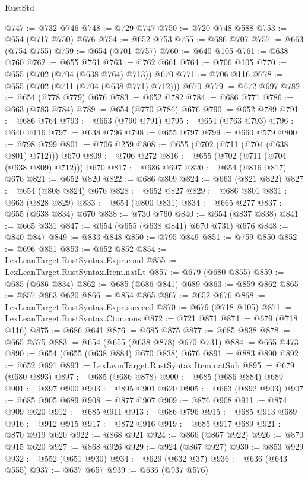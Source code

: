 \begin{lexlean}{RustStd}
\begin{coremodule}
@747 := @732 @746
@748 := @729 @747
@750 := @720 @748 @588
@753 := @654 (@717 @750) @676
@754 := @652 @753
@755 := @686 @707
@757 := @663 (@754 @755)
@759 := @654 (@701 @757)
@760 := @640 @105
@761 := @638 @760
@762 := @655 @761
@763 := @762 @661
@764 := @706 @105
@770 := @655 (@702 (@704 (@638 @764) @713)) @670
@771 := @706 @116
@778 := @655 (@702 (@711 (@704 (@638 @771) @712))) @670
@779 := @672 @697
@782 := @654 (@778 @779) @676
@783 := @652 @782
@784 := @686 @771
@786 := @663 (@783 @784)
@789 := @654 (@770 @786) @676
@790 := @652 @789
@791 := @686 @764
@793 := @663 (@790 @791)
@795 := @654 (@763 @793)
@796 := @640 @116
@797 := @638 @796
@798 := @655 @797
@799 := @660 @579
@800 := @798 @799
@801 := @706 @259
@808 := @655 (@702 (@711 (@704 (@638 @801) @712))) @670
@809 := @706 @272
@816 := @655 (@702 (@711 (@704 (@638 @809) @712))) @670
@817 := @686 @697
@820 := @654 (@816 @817) @676
@821 := @652 @820
@822 := @686 @809
@824 := @663 (@821 @822)
@827 := @654 (@808 @824) @676
@828 := @652 @827
@829 := @686 @801
@831 := @663 (@828 @829)
@833 := @654 (@800 @831)
@834 := @665 @277
@837 := @655 (@638 @834) @670
@838 := @730 @760
@840 := @654 (@837 @838)
@841 := @665 @331
@847 := @654 (@655 (@638 @841) @670 @731) @676
@848 := @840 @847
@849 := @833 @848
@850 := @795 @849
@851 := @759 @850
@852 := @696 @851
@853 := @652 @852
@854 := LexLeanTarget.RustSyntax.Expr.cond
@855 := LexLeanTarget.RustSyntax.Item.natLt
@857 := @679 (@680 @855)
@859 := @685 (@686 @834)
@862 := @685 (@686 @841) @689
@863 := @859 @862
@865 := @857 @863 @620
@866 := @854 @865
@867 := @652 @676
@868 := LexLeanTarget.RustSyntax.Expr.succeed
@870 := @679 (@718 @105)
@871 := LexLeanTarget.RustSyntax.Ctor.cons
@872 := @721 @871
@874 := @679 (@718 @116)
@875 := @686 @641
@876 := @685 @875
@877 := @685 @838
@878 := @665 @375
@883 := @654 (@655 (@638 @878) @670 @731)
@884 := @665 @473
@890 := @654 (@655 (@638 @884) @670 @838) @676
@891 := @883 @890
@892 := @652 @891
@893 := LexLeanTarget.RustSyntax.Item.natSub
@895 := @679 (@680 @893)
@897 := @685 (@686 @878)
@900 := @685 (@686 @884) @689
@901 := @897 @900
@903 := @895 @901 @620
@905 := @663 (@892 @903)
@907 := @685 @905 @689
@908 := @877 @907
@909 := @876 @908
@911 := @874 @909 @620
@912 := @685 @911
@913 := @686 @796
@915 := @685 @913 @689
@916 := @912 @915
@917 := @872 @916
@919 := @685 @917 @689
@921 := @870 @919 @620
@922 := @868 @921
@924 := @866 (@867 @922)
@926 := @870 @915 @620
@927 := @868 @926
@929 := @924 (@867 @927)
@930 := @853 @929
@932 := @552 (@651 @930)
@934 := @629 (@632 @37)
@936 := @636 (@643 @555)
@937 := @637 @657
@939 := @636 (@937 @576)

\end{coremodule}
\end{lexlean}
